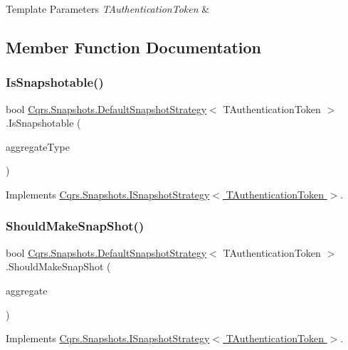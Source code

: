 \begin{DoxyTemplParams}{Template Parameters}
{\em T\+Authentication\+Token} & \\
\hline
\end{DoxyTemplParams}


\subsection{Member Function Documentation}
\mbox{\label{classCqrs_1_1Snapshots_1_1DefaultSnapshotStrategy_aea1e973d654aaee6f620543be7343fda}} 
\subsubsection{\texorpdfstring{Is\+Snapshotable()}{IsSnapshotable()}}
{\footnotesize\ttfamily bool \hyperlink{classCqrs_1_1Snapshots_1_1DefaultSnapshotStrategy}{Cqrs.\+Snapshots.\+Default\+Snapshot\+Strategy}$<$ T\+Authentication\+Token $>$.Is\+Snapshotable (\begin{DoxyParamCaption}\item[{Type}]{aggregate\+Type }\end{DoxyParamCaption})}



Implements \hyperlink{interfaceCqrs_1_1Snapshots_1_1ISnapshotStrategy_a02121821312c4ce2811b31eeaffabe51}{Cqrs.\+Snapshots.\+I\+Snapshot\+Strategy$<$ T\+Authentication\+Token $>$}.

\mbox{\label{classCqrs_1_1Snapshots_1_1DefaultSnapshotStrategy_a59ee11e5c488a40933685e232661df39}} 
\subsubsection{\texorpdfstring{Should\+Make\+Snap\+Shot()}{ShouldMakeSnapShot()}}
{\footnotesize\ttfamily bool \hyperlink{classCqrs_1_1Snapshots_1_1DefaultSnapshotStrategy}{Cqrs.\+Snapshots.\+Default\+Snapshot\+Strategy}$<$ T\+Authentication\+Token $>$.Should\+Make\+Snap\+Shot (\begin{DoxyParamCaption}\item[{\hyperlink{interfaceCqrs_1_1Domain_1_1IAggregateRoot}{I\+Aggregate\+Root}$<$ T\+Authentication\+Token $>$}]{aggregate }\end{DoxyParamCaption})}



Implements \hyperlink{interfaceCqrs_1_1Snapshots_1_1ISnapshotStrategy_ab1d54cd76c7ac832329cb3a6de0effcd}{Cqrs.\+Snapshots.\+I\+Snapshot\+Strategy$<$ T\+Authentication\+Token $>$}.

